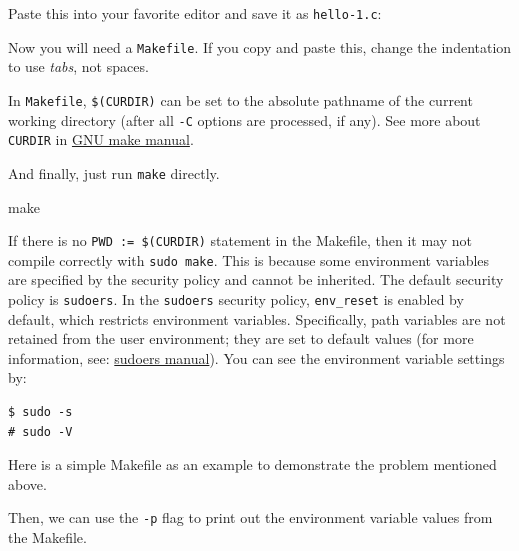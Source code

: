 \documentclass[10pt, oneside]{book}
\begin{document}
Paste this into your favorite editor and save it as \verb|hello-1.c|:


Now you will need a \verb|Makefile|. If you copy and paste this, change the indentation to use \textit{tabs}, not spaces.


In \verb|Makefile|, \verb|$(CURDIR)| can be set to the absolute pathname of the current working directory (after all \verb|-C| options are processed, if any).
See more about \verb|CURDIR| in \href{https://www.gnu.org/software/make/manual/make.html}{GNU make manual}.

And finally, just run \verb|make| directly.

\begin{codebash}
make
\end{codebash}

If there is no \verb|PWD := $(CURDIR)| statement in the Makefile, then it may not compile correctly with \verb|sudo make|.
This is because some environment variables are specified by the security policy and cannot be inherited.
The default security policy is \verb|sudoers|.
In the \verb|sudoers| security policy, \verb|env_reset| is enabled by default, which restricts environment variables.
Specifically, path variables are not retained from the user environment;
they are set to default values (for more information, see: \href{https://www.sudo.ws/docs/man/sudoers.man/}{sudoers manual}).
You can see the environment variable settings by:

\begin{verbatim}
$ sudo -s
# sudo -V
\end{verbatim}

Here is a simple Makefile as an example to demonstrate the problem mentioned above.


Then, we can use the \verb|-p| flag to print out the environment variable values from the Makefile.
\end{document}
